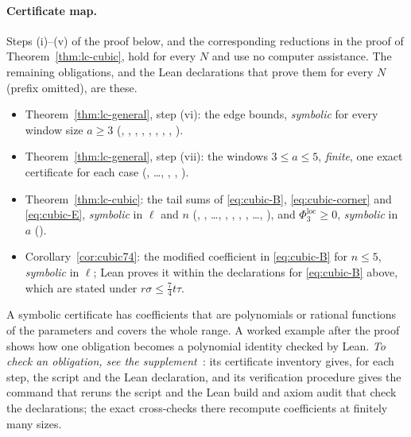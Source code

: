 \paragraph{Certificate map.}
Steps (i)--(v) of the proof below, and the corresponding reductions in the proof of Theorem~\ref{thm:lc-cubic}, hold for every $N$ and use no computer assistance. The remaining obligations, and the Lean declarations that prove them for every $N$ (prefix  omitted), are these.
\begin{itemize}
\item Theorem~\ref{thm:lc-general}, step (vi): the edge bounds, \emph{symbolic} for every window size $a\geq3$ (, , , , , , , , ).
\item Theorem~\ref{thm:lc-general}, step (vii): the windows $3\leq a\leq5$, \emph{finite}, one exact certificate for each case (, \dots, , , ).
\item Theorem~\ref{thm:lc-cubic}: the tail sums of \eqref{eq:cubic-B}, \eqref{eq:cubic-corner} and \eqref{eq:cubic-E}, \emph{symbolic} in $\ell$ and $n$ (, , \dots, , , , , \dots, ), and $\Phi^{\mathrm{loc}}_3\geq0$, \emph{symbolic} in $a$ ().
\item Corollary~\ref{cor:cubic74}: the modified coefficient in \eqref{eq:cubic-B} for $n\leq5$, \emph{symbolic} in $\ell$; Lean proves it within the declarations for \eqref{eq:cubic-B} above, which are stated under $r\sigma\leq\frac74t\tau$.
\end{itemize}
A symbolic certificate has coefficients that are polynomials or rational functions of the parameters and covers the whole range. A worked example after the proof shows how one obligation becomes a polynomial identity checked by Lean. \emph{To check an obligation, see the supplement~\cite{supp}}: its certificate inventory gives, for each step, the script and the Lean declaration, and its verification procedure gives the command that reruns the script and the Lean build and axiom audit that check the declarations; the exact cross-checks there recompute coefficients at finitely many sizes.
